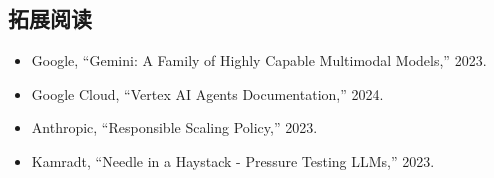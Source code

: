 \subsection{拓展阅读}

\begin{itemize}
    \item Google, ``Gemini: A Family of Highly Capable Multimodal Models,'' 2023.
    \item Google Cloud, ``Vertex AI Agents Documentation,'' 2024.
    \item Anthropic, ``Responsible Scaling Policy,'' 2023.
    \item Kamradt, ``Needle in a Haystack - Pressure Testing LLMs,'' 2023.
\end{itemize}


